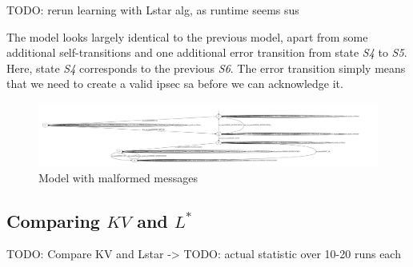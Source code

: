 TODO: rerun learning with Lstar alg, as runtime seems sus

The model looks largely identical to the previous model, apart from some additional self-transitions and one additional error transition from state \emph{S4} to \emph{S5}. Here, state \emph{S4} corresponds to the previous \emph{S6}. The error transition simply means that we need to create a valid \ac{ipsec} \ac{sa} before we can acknowledge it.

\begin{figure}
	\centering
	\includegraphics[width=\linewidth]{images/WithFilterWithErrors}
	\caption{Model with malformed messages}
	\label{fig:withfilterwitherrors}
\end{figure}

\subsection{Comparing $KV$ and $L^*$} \label{subsec:comp_kv_lstar}
TODO: Compare KV and Lstar -> TODO: actual statistic over 10-20 runs each


